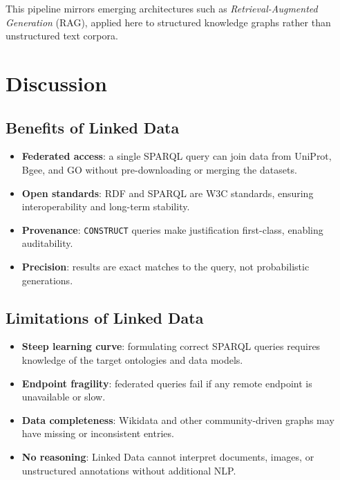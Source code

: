 \documentclass[12pt,a4paper]{article}
\begin{document}
This pipeline mirrors emerging architectures such as
\emph{Retrieval-Augmented Generation} (RAG), applied here to structured
knowledge graphs rather than unstructured text corpora.


\newpage
\section{Discussion}
\label{sec:discussion}

\subsection{Benefits of Linked Data}
\begin{itemize}
  \item \textbf{Federated access}: a single SPARQL query can join data from
        UniProt, Bgee, and GO without pre-downloading or merging the datasets.
  \item \textbf{Open standards}: RDF and SPARQL are W3C standards, ensuring
        interoperability and long-term stability.
  \item \textbf{Provenance}: \texttt{CONSTRUCT} queries make justification
        first-class, enabling auditability.
  \item \textbf{Precision}: results are exact matches to the query, not
        probabilistic generations.
\end{itemize}

\subsection{Limitations of Linked Data}
\begin{itemize}
  \item \textbf{Steep learning curve}: formulating correct SPARQL queries
        requires knowledge of the target ontologies and data models.
  \item \textbf{Endpoint fragility}: federated queries fail if any remote
        endpoint is unavailable or slow.
  \item \textbf{Data completeness}: Wikidata and other community-driven
        graphs may have missing or inconsistent entries.
  \item \textbf{No reasoning}: Linked Data cannot interpret
        documents, images, or unstructured annotations without additional NLP.
\end{itemize}
\end{document}
